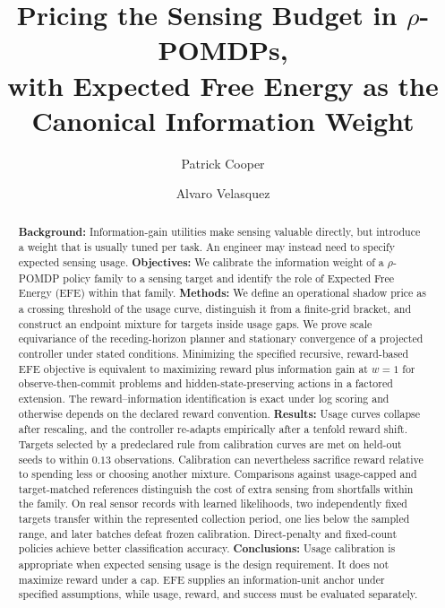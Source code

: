 \documentclass[manuscript, screen, review]{jair}
\begin{document}
\title[Pricing the Sensing Budget in $\rho$-POMDPs]{Pricing the Sensing Budget in $\rho$-POMDPs,\\
with Expected Free Energy as the Canonical Information Weight}

\author{Patrick Cooper}

\author{Alvaro Velasquez}

\renewcommand{\shortauthors}{Cooper and Velasquez}

\begin{abstract}
\textbf{Background:} Information-gain utilities make sensing valuable directly, but introduce a weight that is usually tuned per task. An engineer may instead need to specify expected sensing usage.
\textbf{Objectives:} We calibrate the information weight of a $\rho$-POMDP policy family to a sensing target and identify the role of Expected Free Energy (EFE) within that family.
\textbf{Methods:} We define an operational shadow price as a crossing threshold of the usage curve, distinguish it from a finite-grid bracket, and construct an endpoint mixture for targets inside usage gaps. We prove scale equivariance of the receding-horizon planner and stationary convergence of a projected controller under stated conditions. Minimizing the specified recursive, reward-based EFE objective is equivalent to maximizing reward plus information gain at $w=1$ for observe-then-commit problems and hidden-state-preserving actions in a factored extension. The reward--information identification is exact under log scoring and otherwise depends on the declared reward convention.
\textbf{Results:} Usage curves collapse after rescaling, and the controller re-adapts empirically after a tenfold reward shift. Targets selected by a predeclared rule from calibration curves are met on held-out seeds to within $0.13$ observations. Calibration can nevertheless sacrifice reward relative to spending less or choosing another mixture. Comparisons against usage-capped and target-matched references distinguish the cost of extra sensing from shortfalls within the family. On real sensor records with learned likelihoods, two independently fixed targets transfer within the represented collection period, one lies below the sampled range, and later batches defeat frozen calibration. Direct-penalty and fixed-count policies achieve better classification accuracy.
\textbf{Conclusions:} Usage calibration is appropriate when expected sensing usage is the design requirement. It does not maximize reward under a cap. EFE supplies an information-unit anchor under specified assumptions, while usage, reward, and success must be evaluated separately.
\end{abstract}
\end{document}
